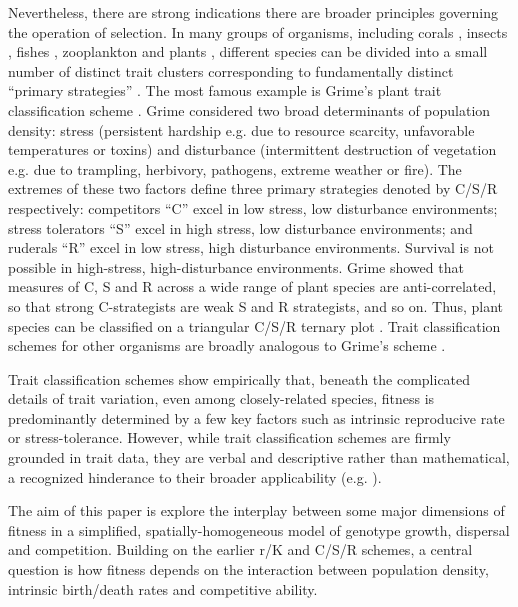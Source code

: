\documentclass[11pt]{article}
\begin{document}
Nevertheless, there are strong indications there are broader principles governing the operation of selection. In many groups of organisms, including corals \citep{darling_2012}, insects \citep{southwood_1977}, fishes \citep{winemiller_1992}, zooplankton \citep{allan_76} and plants \citep{grime_1988,westoby_1998}, different species can be divided into a small number of distinct trait clusters corresponding to fundamentally distinct ``primary strategies'' \citep{winemiller_2015}. The most famous example is Grime's plant trait classification scheme \citep{grime_1974,grime_1977,grime_1988}. Grime considered two broad determinants of population density: stress (persistent hardship e.g. due to resource scarcity, unfavorable temperatures or toxins) and disturbance (intermittent destruction of vegetation e.g. due to trampling, herbivory, pathogens, extreme weather or fire).  The extremes of these two factors define three primary strategies denoted by C/S/R respectively: competitors ``C'' excel in low stress, low disturbance environments; stress tolerators ``S'' excel in high stress, low disturbance environments; and ruderals ``R''  excel in low stress, high disturbance environments. Survival is not possible in high-stress, high-disturbance environments. Grime showed that measures of C, S and R across a wide range of plant species are anti-correlated, so that strong C-strategists are weak S and R strategists, and so on. Thus, plant species can be classified on a triangular C/S/R ternary plot \citep{grime_1974}. Trait classification schemes for other organisms are broadly analogous to Grime's scheme \citep{winemiller_2015}. 

Trait classification schemes show empirically that, beneath the complicated details of trait variation, even among closely-related species, fitness is predominantly determined by a few key factors such as intrinsic reproducive rate or stress-tolerance. However, while trait classification schemes are firmly grounded in trait data, they are verbal and descriptive rather than mathematical, a recognized hinderance to their broader applicability (e.g. \citep{tilman_2007}). 

The aim of this paper is explore the interplay between some major dimensions of fitness in a simplified, spatially-homogeneous model of genotype growth, dispersal and competition. Building on the earlier r/K and C/S/R schemes, a central question is how fitness depends on the interaction between population density, intrinsic birth/death rates and competitive ability. 
\end{document}

